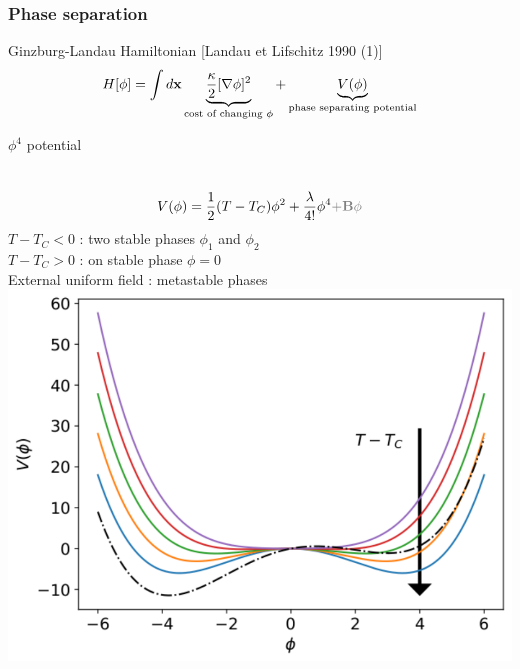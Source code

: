 \documentclass[9pt, dvipsnames,aspectratio=169]{beamer} %
\newcommand{\bx}{{\bf x}} %
\begin{document}
\begin{frame}
    \frametitle{Phase separation}
        \begin{block}{Ginzburg-Landau Hamiltonian [Landau et Lifschitz 1990 (1)]} 
        \begin{align}
            H[\phi] = \int d\bx  \underbrace{\frac{\kappa}{2}[\nabla \phi]^2}_{\text{cost of changing $\phi$}} + \underbrace{V(\phi)}_{\text{phase separating potential}}
        \end{align}
       	\end{block}

       	\begin{block}{$\phi^4$ potential}
			\begin{columns}
       		\begin{align}
       			V(\phi) = \frac{1}{2} (T-T_C) \phi^2 + \frac{\lambda}{4!} \phi^4       			{\color{gray} \bf + B \phi}
       		\end{align}     
       		$T-T_C \less 0 $ : two stable phases $\phi_1$ and $\phi_2$ \\
       		$T-T_C \greater 0$ : on stable phase $\phi = 0$ \\
       		External uniform field : metastable phases
       	\centering
        \includegraphics[width=\linewidth]{double-puit-en-fonction-temp.pdf}
        \end{columns}
       	\end{block}        
\end{frame}
\end{document}
